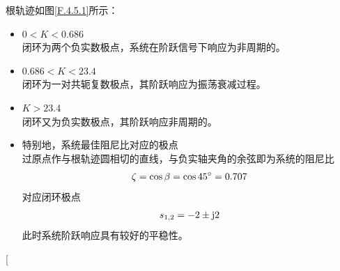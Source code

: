根轨迹如图\ref{F.4.5.1}所示：
\begin{itemize}
	\item $0<K<0.686$\\
	闭环为两个负实数极点，系统在阶跃信号下响应为非周期的。
	\item $0.686<K<23.4$\\
	闭环为一对共轭复数极点，其阶跃响应为振荡衰减过程。
	\item $K>23.4$\\
	闭环又为负实数极点，其阶跃响应非周期的。
	
	\item 特别地，系统最佳阻尼比对应的极点\\
	过原点作与根轨迹圆相切的直线，与负实轴夹角的余弦即为系统的阻尼比
	\begin{align*}
		\zeta = \cos \beta = \cos 45{}^{\circ} = 0.707
	\end{align*}
	对应闭环极点
	\begin{align*}
		s_{1,2} = - 2 \pm \text{j} 2
	\end{align*}
	此时系统阶跃响应具有较好的平稳性。
\end{itemize}
\warn[
